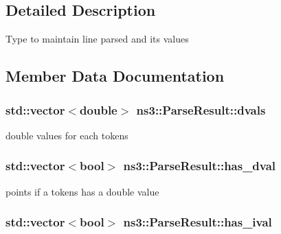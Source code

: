 \subsection{Detailed Description}
Type to maintain line parsed and its values 

\subsection{Member Data Documentation}
\subsubsection[{\texorpdfstring{dvals}{dvals}}]{\setlength{\rightskip}{0pt plus 5cm}std\+::vector$<$double$>$ ns3\+::\+Parse\+Result\+::dvals}\hypertarget{structns3_1_1ParseResult_a0b4fe77a1ffa89ee2fe02c42dc1c6dba}{}\label{structns3_1_1ParseResult_a0b4fe77a1ffa89ee2fe02c42dc1c6dba}


double values for each tokens 

\subsubsection[{\texorpdfstring{has\+\_\+dval}{has_dval}}]{\setlength{\rightskip}{0pt plus 5cm}std\+::vector$<$bool$>$ ns3\+::\+Parse\+Result\+::has\+\_\+dval}\hypertarget{structns3_1_1ParseResult_ac9d008ac8c44f45e6b2fbd4b22c7df00}{}\label{structns3_1_1ParseResult_ac9d008ac8c44f45e6b2fbd4b22c7df00}


points if a tokens has a double value 

\subsubsection[{\texorpdfstring{has\+\_\+ival}{has_ival}}]{\setlength{\rightskip}{0pt plus 5cm}std\+::vector$<$bool$>$ ns3\+::\+Parse\+Result\+::has\+\_\+ival}\hypertarget{structns3_1_1ParseResult_ac0f1c980518c55a84a8dbf4c016666f5}{}\label{structns3_1_1ParseResult_ac0f1c980518c55a84a8dbf4c016666f5}


